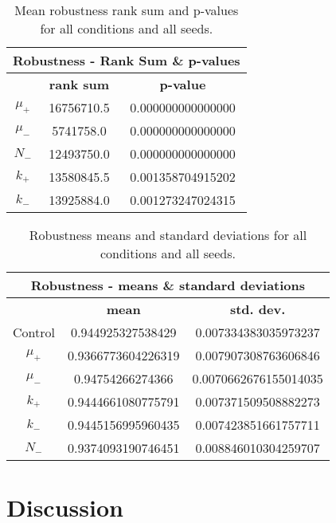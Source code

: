 \begin{table}
	\begin{tabular}{|c|c|c|}
		\hline
		\multicolumn{3}{c}{\Large \textbf{Robustness - Rank Sum \& p-values}} \\
		\hline
		& \textbf{rank sum} & \textbf{p-value} \\
		\hline
		$\mu_+$ & 16756710.5 & 0.000000000000000 \\
		\hline
		$\mu_-$ & 5741758.0 & 0.000000000000000 \\
		\hline
		$N_-$ & 12493750.0 & 0.000000000000000 \\
		\hline
		$k_+$ & 13580845.5 & 0.001358704915202 \\
		\hline
		$k_-$ & 13925884.0 & 0.001273247024315 \\
		\hline
	\end{tabular}
	\caption[Robustness rank sum \& p-values]{Mean robustness rank sum and p-values for all conditions and all seeds.}
	\label{table:rank_sum_p-values}
\end{table}
\begin{table}[H]
	\begin{tabular}{|c|c|c|}
		\hline
		\multicolumn{3}{c}{\Large \textbf{Robustness - means \& standard deviations}} \\
		\hline
		& \textbf{mean} & \textbf{std. dev.} \\
		\hline
		Control & 0.944925327538429	& 0.007334383035973237 \\
		\hline
		$\mu_+$ & 0.9366773604226319 & 0.007907308763606846 \\
		\hline
		$\mu_-$ &	0.94754266274366 & 0.0070662676155014035 \\
		\hline
		$k_+$ & 0.9444661080775791 & 0.007371509508882273 \\
		\hline
		$k_-$ & 0.9445156995960435	& 0.007423851661757711 \\
		\hline
		$N_-$ & 0.9374093190746451 & 0.008846010304259707 \\
		\hline
	\end{tabular}
	\caption[Robustness means and standard deviations]{Robustness means and standard deviations for all conditions and all seeds.}
	\label{table:robustness_means_and_std_dev}
\end{table}


\section{Discussion}\label{discussion}

